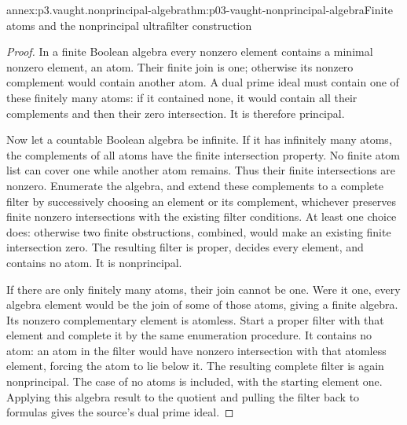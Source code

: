 \begin{annexitem}{annex:p3.vaught.nonprincipal-algebra}{thm:p03-vaught-nonprincipal-algebra}{Finite atoms and the nonprincipal ultrafilter construction}
\begin{proof}
In a finite Boolean algebra every nonzero element contains a minimal
nonzero element, an atom. Their finite join is one; otherwise its
nonzero complement would contain another atom.
A dual prime ideal must contain one of these finitely many atoms:
if it contained none, it would contain all their complements and
then their zero intersection. It is therefore principal.

Now let a countable Boolean algebra be infinite.
If it has infinitely many atoms, the complements of all atoms have
the finite intersection property. No finite atom list can cover one
while another atom remains. Thus their finite intersections are
nonzero. Enumerate the algebra, and extend these complements to a
complete filter by successively choosing an element or its complement,
whichever preserves finite nonzero intersections with the existing
filter conditions. At least one choice does: otherwise two finite
obstructions, combined, would make an existing finite intersection
zero. The resulting filter is proper, decides every element, and
contains no atom. It is nonprincipal.

If there are only finitely many atoms, their join cannot be one.
Were it one, every algebra element would be the join of some of
those atoms, giving a finite algebra.
Its nonzero complementary element is atomless.
Start a proper filter with that element and complete it by the same
enumeration procedure. It contains no atom: an atom in the filter
would have nonzero intersection with that atomless element, forcing
the atom to lie below it. The resulting complete filter is again
nonprincipal. The case of no atoms is included, with the starting
element one.
Applying this algebra result to the quotient and pulling the filter
back to formulas gives the source's dual prime ideal.
\end{proof}
\end{annexitem}


